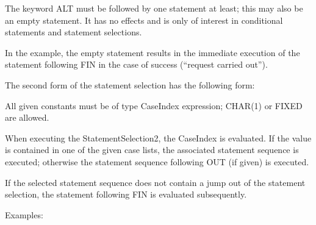 The keyword ALT must be followed by
one statement at least; this may also be an empty statement. It has no
effects and is only of interest in conditional statements and statement
selections.

In the example, the empty statement results in the immediate execution
of the statement following FIN in the case of success (``request carried
out'').


The second form of the statement selection has the following form:









All given constants must be of type CaseIndex expression; CHAR(1) or
FIXED are allowed.

When executing the StatementSelection2, the CaseIndex is evaluated.
If the value is contained in one of the given case lists, the associated
statement sequence is executed; otherwise the statement sequence
following OUT (if given) is executed.

If the selected statement sequence does not contain a jump out of the
statement selection, the statement following FIN is evaluated
subsequently.

Examples:

